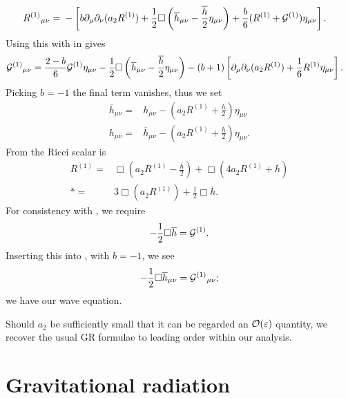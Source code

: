 \begin{align}
{R^{(1)}}_{\mu\nu} = {} & -\left[b \partial_\mu\partial_\nu(a_2  R^{(1)}) + \frac{1}{2}\Box\left(\overline{h}_{\mu\nu} -\frac{\overline{h}}{2}\eta_{\mu\nu}\right) + \frac{b}{6}(R^{(1)} + \mathcal{G}^{(1)})\eta_{\mu\nu}\right].
\label{eq:new_Ricci}
\end{align}
Using this with  in  gives
\begin{align}
{\mathcal{G}^{(1)}}_{\mu\nu} = {} & \frac{2 - b}{6}\mathcal{G}^{(1)}\eta_{\mu\nu} -\frac{1}{2}\Box\left(\overline{h}_{\mu\nu} - \frac{\overline{h}}{2}\eta_{\mu\nu}\right) - (b + 1)\left[\partial_\mu\partial_\nu(a_2 R^{(1)}) + \frac{1}{6}R^{(1)}\eta_{\mu\nu}\right].
\label{eq:b_Field}
\end{align}
Picking $b = -1$ the final term vanishes, thus we set~\cite{Will1993, Corda2008, Capozziello2008}
\begin{subequations}
\begin{align}
\label{eq:hbar_metric}
\overline{h}_{\mu\nu} = {} & h_{\mu\nu} - \left(a_2 R^{(1)} + \frac{h}{2}\right)\eta_{\mu\nu}\\
h_{\mu\nu} = {} & \overline{h}_{\mu\nu} - \left(a_2 R^{(1)} + \frac{\overline{h}}{2}\right)\eta_{\mu\nu}.
\label{eq:h_metric}
\end{align}
\end{subequations}
From  the Ricci scalar is 
\begin{align}
R^{(1)} = {} & \Box \left(a_2 R^{(1)} -\frac{\overline{h}}{2}\right) + \Box (4 a_2 R^{(1)} + \overline{h}) \nonumber \\*
 = {} & 3 \Box(a_2 R^{(1)}) + \frac{1}{2}\Box \overline{h}.
\label{eq:Ricci_Box_h}
\end{align}
For consistency with , we require
\begin{equation}
-\frac{1}{2}\Box \overline{h} = \mathcal{G}^{(1)}.
\label{eq:Box_h}
\end{equation}
Inserting this into , with $b = -1$, we see
\begin{equation}
-\frac{1}{2}\Box \overline{h}_{\mu\nu} = {\mathcal{G}^{(1)}}_{\mu\nu};
\label{eq:Box_hmunu}
\end{equation}
we have our wave equation.

Should $a_2$ be sufficiently small that it can be regarded an $\mathcal{O}({\varepsilon})$ quantity, we recover the usual GR formulae to leading order within our analysis.

\section{Gravitational radiation\label{sec:Rad}}

